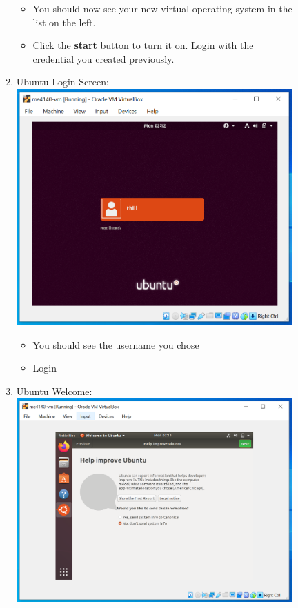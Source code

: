 \documentclass[12pt]{article}
\begin{document}
\begin{description}
\begin{description}
\begin{enumerate}
      		 \begin{itemize}
        	\item You should now see your new virtual operating system in the list on the left. 
        	\item Click the {\bf start} button to turn it on. Login with the credential you created previously.
    		\end{itemize} 
    	
    	\newpage
    		\item Ubuntu Login Screen: \vspace{5mm} \\
      		\includegraphics[scale=.55]{Capture23.png}
      		 \begin{itemize}
        	\item You should see the username you chose 
        	\item Login
    		\end{itemize} 
    		 \vspace{5mm} 
    		\item Ubuntu Welcome: \vspace{5mm} \\
      		\includegraphics[scale=.55]{Capture24.png}

\end{enumerate}
\end{description}
\end{description}
\end{document}
